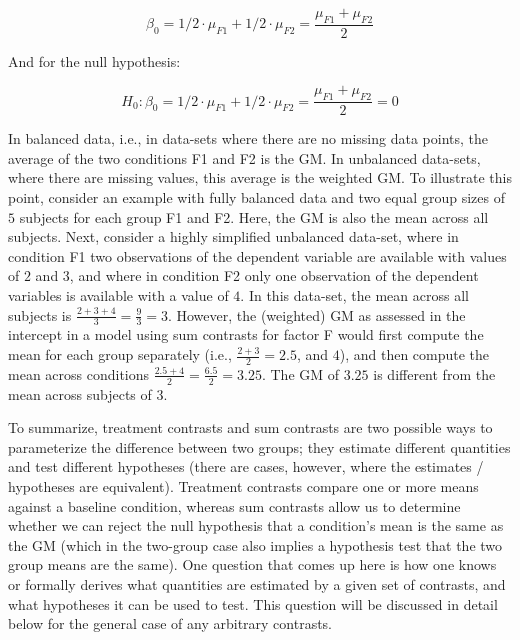 \documentclass[12pt,]{krantz}
\begin{document}
\begin{equation}
\beta_0 = 1/2 \cdot \mu_{F1} + 1/2 \cdot \mu_{F2} = \frac{\mu_{F1} + \mu_{F2}}{2}
\end{equation}

And for the null hypothesis:

\begin{equation}
H_0: \beta_0 = 1/2 \cdot \mu_{F1} + 1/2 \cdot \mu_{F2} = \frac{\mu_{F1} + \mu_{F2}}{2} = 0
\end{equation}

\noindent
In balanced data, i.e., in data-sets where there are no missing data points, the average of the two conditions F1 and F2 is the GM. In unbalanced data-sets, where there are missing values, this average is the weighted GM.
To illustrate this point, consider an example with fully balanced data and two equal group sizes of \(5\) subjects for each group F1 and F2. Here, the GM is also the mean across all subjects. Next, consider a highly simplified unbalanced data-set, where in condition F1 two observations of the dependent variable are available with values of \(2\) and \(3\), and where in condition F2 only one observation of the dependent variables is available with a value of \(4\). In this data-set, the mean across all subjects is \(\frac{2 + 3 + 4}{3} = \frac{9}{3} = 3\). However, the (weighted) GM as assessed in the intercept in a model using sum contrasts for factor F would first compute the mean for each group separately (i.e., \(\frac{2 + 3}{2} = 2.5\), and \(4\)), and then compute the mean across conditions \(\frac{2.5 + 4}{2} = \frac{6.5}{2} = 3.25\). The GM of \(3.25\) is different from the mean across subjects of \(3\).

To summarize, treatment contrasts and sum contrasts are two possible ways to parameterize the difference between two groups; they estimate different quantities and test different hypotheses (there are cases, however, where the estimates / hypotheses are equivalent). Treatment contrasts compare one or more means against a baseline condition, whereas sum contrasts allow us to determine whether we can reject the null hypothesis that a condition's mean is the same as the GM (which in the two-group case also implies a hypothesis test that the two group means are the same). One question that comes up here is how one knows or formally derives what quantities are estimated by a given set of contrasts, and what hypotheses it can be used to test. This question will be discussed in detail below for the general case of any arbitrary contrasts.
\end{document}
